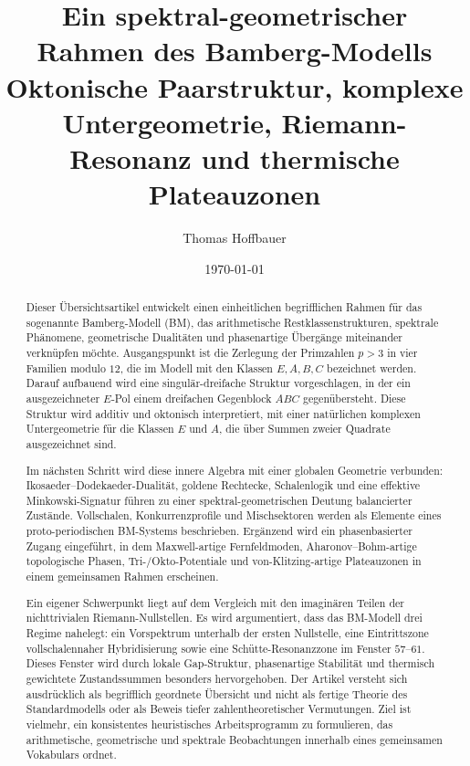 \documentclass[11pt,a4paper]{article}
\title{Ein spektral-geometrischer Rahmen des Bamberg-Modells\\
	\large Oktonische Paarstruktur, komplexe Untergeometrie, Riemann-Resonanz und thermische Plateauzonen}
\author{Thomas Hoffbauer}
\date{\today}
\theoremstyle{definition}
\theoremstyle{plain}
\begin{document}
	\maketitle
	
	\begin{abstract}
		Dieser Übersichtsartikel entwickelt einen einheitlichen begrifflichen Rahmen für das sogenannte Bamberg-Modell (BM), das arithmetische Restklassenstrukturen, spektrale Phänomene, geometrische Dualitäten und phasenartige Übergänge miteinander verknüpfen möchte. Ausgangspunkt ist die Zerlegung der Primzahlen $p>3$ in vier Familien modulo $12$, die im Modell mit den Klassen $E,A,B,C$ bezeichnet werden. Darauf aufbauend wird eine singulär-dreifache Struktur vorgeschlagen, in der ein ausgezeichneter $E$-Pol einem dreifachen Gegenblock $ABC$ gegenübersteht. Diese Struktur wird additiv und oktonisch interpretiert, mit einer natürlichen komplexen Untergeometrie für die Klassen $E$ und $A$, die über Summen zweier Quadrate ausgezeichnet sind.
		
		Im nächsten Schritt wird diese innere Algebra mit einer globalen Geometrie verbunden: Ikosaeder--Dodekaeder-Dualität, goldene Rechtecke, Schalenlogik und eine effektive Minkowski-Signatur führen zu einer spektral-geometrischen Deutung balancierter Zustände. Vollschalen, Konkurrenzprofile und Mischsektoren werden als Elemente eines proto-periodischen BM-Systems beschrieben. Ergänzend wird ein phasenbasierter Zugang eingeführt, in dem Maxwell-artige Fernfeldmoden, Aharonov--Bohm-artige topologische Phasen, Tri-/Okto-Potentiale und von-Klitzing-artige Plateauzonen in einem gemeinsamen Rahmen erscheinen.
		
		Ein eigener Schwerpunkt liegt auf dem Vergleich mit den imaginären Teilen der nichttrivialen Riemann-Nullstellen. Es wird argumentiert, dass das BM-Modell drei Regime nahelegt: ein Vorspektrum unterhalb der ersten Nullstelle, eine Eintrittszone vollschalennaher Hybridisierung sowie eine Schütte-Resonanzzone im Fenster $57$--$61$. Dieses Fenster wird durch lokale Gap-Struktur, phasenartige Stabilität und thermisch gewichtete Zustandssummen besonders hervorgehoben. Der Artikel versteht sich ausdrücklich als begrifflich geordnete Übersicht und nicht als fertige Theorie des Standardmodells oder als Beweis tiefer zahlentheoretischer Vermutungen. Ziel ist vielmehr, ein konsistentes heuristisches Arbeitsprogramm zu formulieren, das arithmetische, geometrische und spektrale Beobachtungen innerhalb eines gemeinsamen Vokabulars ordnet.
	\end{abstract}
	
\end{document}

